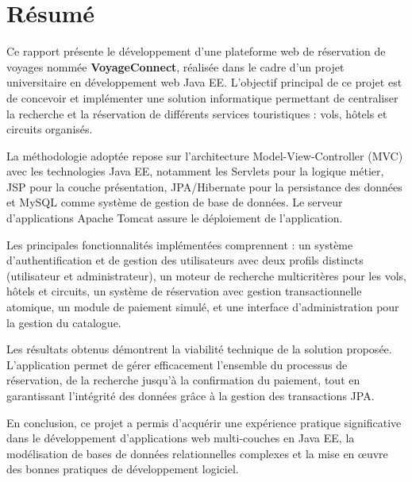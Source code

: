 \documentclass[12pt,a4paper]{report}
\begin{document}
\section*{Résumé}

Ce rapport présente le développement d'une plateforme web de réservation de voyages nommée \textbf{VoyageConnect}, réalisée dans le cadre d'un projet universitaire en développement web Java EE. L'objectif principal de ce projet est de concevoir et implémenter une solution informatique permettant de centraliser la recherche et la réservation de différents services touristiques : vols, hôtels et circuits organisés.

\vspace{0.3cm}

La méthodologie adoptée repose sur l'architecture Model-View-Controller (MVC) avec les technologies Java EE, notamment les Servlets pour la logique métier, JSP pour la couche présentation, JPA/Hibernate pour la persistance des données et MySQL comme système de gestion de base de données. Le serveur d'applications Apache Tomcat assure le déploiement de l'application.

\vspace{0.3cm}

Les principales fonctionnalités implémentées comprennent : un système d'authentification et de gestion des utilisateurs avec deux profils distincts (utilisateur et administrateur), un moteur de recherche multicritères pour les vols, hôtels et circuits, un système de réservation avec gestion transactionnelle atomique, un module de paiement simulé, et une interface d'administration pour la gestion du catalogue.

\vspace{0.3cm}

Les résultats obtenus démontrent la viabilité technique de la solution proposée. L'application permet de gérer efficacement l'ensemble du processus de réservation, de la recherche jusqu'à la confirmation du paiement, tout en garantissant l'intégrité des données grâce à la gestion des transactions JPA.

\vspace{0.3cm}

En conclusion, ce projet a permis d'acquérir une expérience pratique significative dans le développement d'applications web multi-couches en Java EE, la modélisation de bases de données relationnelles complexes et la mise en œuvre des bonnes pratiques de développement logiciel.

\vspace{0.5cm}
\end{document}

